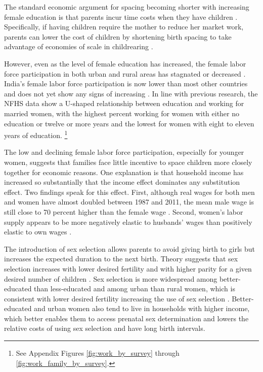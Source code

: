 \documentclass[12pt,letterpaper]{article}
\begin{document}

The standard economic argument for spacing becoming shorter with increasing female education 
is that parents incur time costs when they have children \citep{Hotz1997,schultz97}.
Specifically, if having children require the mother to reduce her market work, parents 
can lower the cost of children by shortening birth spacing to 
take advantage of economies of scale in childrearing \citep{Vijverberg1982}.

However, even as the level of female education has increased, the female labor force 
participation in both urban and rural areas has stagnated or decreased
\citep{Klasen2015,Fletcher2017,Afridi2018,Bhargava2018,Chatterjee2018,Bhargava2019}.
India's female labor force participation is now lower than most other countries and does 
not yet show any signs of increasing \citep{Klasen2015,Chatterjee2018}.
In line with previous research, the NFHS data show a U-shaped relationship between 
education and working for married women, with the highest percent working for women with 
either no education or twelve or more years and the lowest for women with eight to 
eleven years of education.%
\footnote{
See Appendix Figures \ref{fig:work_by_survey} through \ref{fig:work_family_by_survey}. 
}

The low and declining female labor force participation, especially for younger women, 
suggests that families face little incentive to space children more closely 
together for economic reasons.
One explanation is that household income has increased so substantially that the income 
effect dominates any substitution effect.
Two findings speak for this effect.
First, although real wages for both men and women have almost doubled between 1987 and 
2011, the mean male wage is still close to 70 percent higher than the female wage 
\citep{Klasen2015,Bhargava2018}.
Second, women’s labor supply appears to be more negatively elastic to husbands' 
wages than positively elastic to own wages \citep{Bhargava2018}.



The introduction of sex selection allows parents to avoid giving birth to girls but 
increases the expected duration to the next birth.
Theory suggests that sex selection increases with lower desired fertility and with
higher parity for a given desired number of children \citep{Portner2015b}.
Sex selection is more widespread among better-educated than less-educated and among urban 
than rural women, which is consistent with lower desired fertility increasing the
use of sex selection 
\citep{das_gupta97,retherford03b,Guilmoto2009a,Portner2015b,Jayachandran2017}.
Better-educated and urban women also tend to live in households with higher income, which 
better enables them to access prenatal sex determination and lowers the relative costs of 
using sex selection and have long birth intervals.
\end{document}

